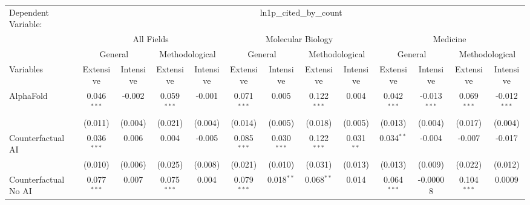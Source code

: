 \begingroup
\centering
\begin{tabular}{lcccccccccccc}
   \tabularnewline \midrule \midrule
   Dependent Variable: & \multicolumn{12}{c}{ln1p\_cited\_by\_count}\\
 & \multicolumn{4}{c}{All Fields} & \multicolumn{4}{c}{Molecular Biology} & \multicolumn{4}{c}{Medicine} \\
\cmidrule(lr){2-5} \cmidrule(lr){6-9} \cmidrule(lr){10-13}
 & \multicolumn{2}{c}{General} & \multicolumn{2}{c}{Methodological} & \multicolumn{2}{c}{General} & \multicolumn{2}{c}{Methodological} & \multicolumn{2}{c}{General} & \multicolumn{2}{c}{Methodological} \\
\cmidrule(lr){2-3} \cmidrule(lr){4-5} \cmidrule(lr){6-7} \cmidrule(lr){8-9} \cmidrule(lr){10-11} \cmidrule(lr){12-13}
Variables & \multicolumn{1}{c}{Extensive} & \multicolumn{1}{c}{Intensive} & \multicolumn{1}{c}{Extensive} & \multicolumn{1}{c}{Intensive} & \multicolumn{1}{c}{Extensive} & \multicolumn{1}{c}{Intensive} & \multicolumn{1}{c}{Extensive} & \multicolumn{1}{c}{Intensive} & \multicolumn{1}{c}{Extensive} & \multicolumn{1}{c}{Intensive} & \multicolumn{1}{c}{Extensive} & \multicolumn{1}{c}{Intensive} \\
\cmidrule(lr){1-1}\cmidrule(lr){2-2} \cmidrule(lr){3-3} \cmidrule(lr){4-4} \cmidrule(lr){5-5} \cmidrule(lr){6-6} \cmidrule(lr){7-7} \cmidrule(lr){8-8} \cmidrule(lr){9-9} \cmidrule(lr){10-10} \cmidrule(lr){11-11} \cmidrule(lr){12-12} \cmidrule(lr){13-13}
   AlphaFold                                & 0.046$^{***}$  & -0.002        & 0.059$^{***}$ & -0.001    & 0.071$^{***}$ & 0.005         & 0.122$^{***}$ & 0.004        & 0.042$^{***}$ & -0.013$^{***}$ & 0.069$^{***}$ & -0.012$^{***}$\\   
                                            & (0.011)        & (0.004)       & (0.021)       & (0.004)   & (0.014)       & (0.005)       & (0.018)       & (0.005)      & (0.013)       & (0.004)        & (0.017)       & (0.004)\\   
   Counterfactual AI                        & 0.036$^{***}$  & 0.006         & 0.004         & -0.005    & 0.085$^{***}$ & 0.030$^{***}$ & 0.122$^{***}$ & 0.031$^{**}$ & 0.034$^{**}$  & -0.004         & -0.007        & -0.017\\   
                                            & (0.010)        & (0.006)       & (0.025)       & (0.008)   & (0.021)       & (0.010)       & (0.031)       & (0.013)      & (0.013)       & (0.009)        & (0.022)       & (0.012)\\   
   Counterfactual No AI                     & 0.077$^{***}$  & 0.007         & 0.075$^{***}$ & 0.004     & 0.079$^{***}$ & 0.018$^{**}$  & 0.068$^{**}$  & 0.014        & 0.064$^{***}$ & -0.00008       & 0.104$^{***}$ & 0.0009\\   

\end{tabular}
